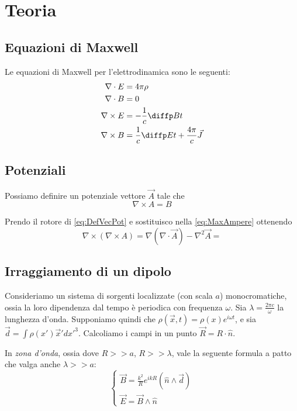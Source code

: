 \documentclass[a4paper,10pt,oneside]{math_article}
\newcommand{\rot}{\nabla \times}
\renewcommand{\div}{\nabla \cdot}
\newcommand{\grad}{\nabla}
\newcommand{\lapl}{\nabla^2}
\begin{document}
	\section{Teoria}
		\subsection{Equazioni di Maxwell}
			Le equazioni di Maxwell per l'elettrodinamica sono le seguenti:
			\begin{align}\displaystyle
				\div E &= 4\pi \rho \label{eq:MaxGauss}\\ 
				\div B &= 0 \label{eq:MaxMonopole} \\
				\rot E &= -\frac1c \diffp Bt \label{eq:MaxFaraday}\\
				\rot B &= \dfrac1c \diffp Et + \dfrac{4\pi}c \vec J \label{eq:MaxAmpere}
			\end{align}
			
		\subsection{Potenziali}
			Possiamo definire un potenziale vettore $\vec A$ tale che
			\begin{equation}\label{eq:DefVecPot}
			 \rot A = B
			\end{equation}

			Prendo il rotore di \ref{eq:DefVecPot} e sostituisco nella \ref{eq:MaxAmpere} ottenendo
			\begin{equation}
				\rot (\rot A) = \grad(\div \vec A) - \lapl \vec A = 
			\end{equation}
			
		\subsection{Irraggiamento di un dipolo}
			Consideriamo un sistema di sorgenti localizzate (con scala $a$) monocromatiche, ossia la loro dipendenza dal tempo è periodica con frequenza $\omega$. Sia $\lambda=\frac{2\pi c}{\omega}$ la lunghezza d'onda.
			Supponiamo quindi che $\rho(\vec x, t) = \rho(x)e^{i\omega t}$, e sia $\vec d= \int \rho(x')\vec x' dx'^3$. Calcoliamo i campi in un punto $\vec R = R\cdot \hat n$.
			
			In \emph{zona d'onda}, ossia dove $R >> a$, $R >> \lambda$, vale la seguente formula a patto che valga anche $\lambda >> a$:
			\begin{equation}
				\begin{cases}
					\vec B = \frac{k^2}{R} e^{ikR} (\hat n \wedge \vec d)\\
					\vec E = \vec B \wedge \hat n
				\end{cases}
			\end{equation}
			
\end{document}
